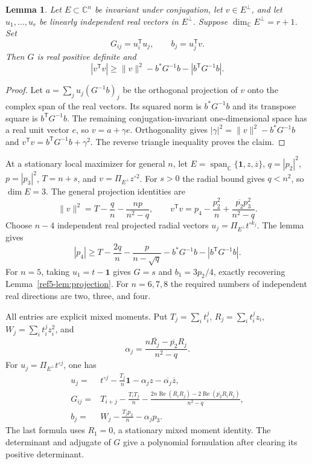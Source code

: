 \documentclass[11pt]{article}
\newtheorem{lemma}[theorem]{Lemma}
\theoremstyle{remark}
\newcommand{\C}{\mathbb C}
\numberwithin{equation}{section}
\begin{document}
\begin{lemma}\label{lem:alignment-real-projection}
Let $E\subset\C^n$ be invariant under conjugation, let $v\in E^\perp$,
and let $u_1,\ldots,u_r$ be linearly independent real vectors in
$E^\perp$. Suppose
$\dim_{\C}E^\perp=r+1$. Set
\[
 G_{ij}=u_i^{\mathsf T}u_j,\qquad b_j=u_j^{\mathsf T}v.
\]
Then $G$ is real positive definite and
\[
 |v^{\mathsf T}v|\ge
 \lVert v\rVert^2-b^*G^{-1}b-|b^{\mathsf T}G^{-1}b|.
\]
\end{lemma}
\begin{proof}
Let $a=\sum_j u_j(G^{-1}b)_j$ be the orthogonal projection of $v$
onto the complex span of the real vectors. Its squared norm is
$b^*G^{-1}b$ and its transpose square is $b^{\mathsf T}G^{-1}b$.
The remaining conjugation-invariant one-dimensional space has a real
unit vector $e$, so $v=a+\gamma e$. Orthogonality gives
$|\gamma|^2=\lVert v\rVert^2-b^*G^{-1}b$ and
$v^{\mathsf T}v=b^{\mathsf T}G^{-1}b+\gamma^2$.
The reverse triangle inequality proves the claim.
\end{proof}

At a stationary local maximizer for general $n$, let
$E=\operatorname{span}_{\C}\{\mathbf1,z,\overline z\}$,
$q=|p_2|^2$, $p=|p_3|^2$, $T=n+s$, and
$v=\Pi_{E^\perp}z^{\circ2}$. For $s>0$ the radial bound gives
$q<n^2$, so $\dim E=3$. The general projection identities are
\[
 \lVert v\rVert^2=T-\frac qn-\frac{np}{n^2-q},\qquad
 v^{\mathsf T}v=p_4-\frac{p_2^2}{n}
                    +\frac{\overline{p_2}p_3^2}{n^2-q}.
\]
Choose $n-4$ independent real projected radial vectors
$u_j=\Pi_{E^\perp}t^{\circ k_j}$. The lemma gives
\begin{equation}\label{eq:alignment-general-projection}
 |p_4|\ge T-\frac{2q}{n}-\frac{p}{n-\sqrt q}
       -b^*G^{-1}b-|b^{\mathsf T}G^{-1}b|.
\end{equation}
For $n=5$, taking $u_1=t-\mathbf1$ gives $G=s$ and
$b_1=3p_2/4$, exactly recovering
Lemma~\ref{ref5-lem:projection}. For $n=6,7,8$ the required
numbers of independent real directions are two, three, and four.

All entries are explicit mixed moments. Put
$T_j=\sum_i t_i^j$, $R_j=\sum_i t_i^jz_i$,
$W_j=\sum_i t_i^jz_i^2$, and
\[
 \alpha_j=\frac{n\overline{R_j}-\overline{p_2}R_j}{n^2-q}.
\]
For $u_j=\Pi_{E^\perp}t^{\circ j}$, one has
\begin{align*}
u_j={}&t^{\circ j}-\frac{T_j}{n}\mathbf1
                  -\alpha_jz-\overline{\alpha_j}\overline z,\\
G_{ij}={}&T_{i+j}-\frac{T_iT_j}{n}
 -\frac{2n\operatorname{Re}(\overline{R_i}R_j)
        -2\operatorname{Re}(\overline{p_2}R_iR_j)}{n^2-q},\\
b_j={}&W_j-\frac{T_jp_2}{n}-\alpha_jp_3.
\end{align*}
The last formula uses $R_1=0$, a stationary mixed moment identity.
The determinant and adjugate of $G$ give a polynomial formulation
after clearing its positive determinant.
\end{document}
